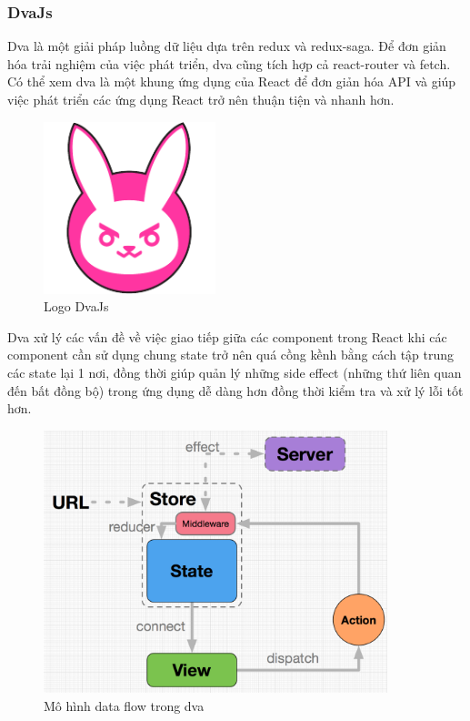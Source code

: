     \subsubsection{DvaJs}
    \hspace*{0.5cm} Dva là một giải pháp luồng dữ liệu dựa trên redux và redux-saga. Để đơn giản hóa trải nghiệm của việc phát triển, dva cũng tích hợp cả react-router và fetch. Có thể xem dva là một khung ứng dụng của React để đơn giản hóa API và giúp việc phát triển các ứng dụng React trở nên thuận tiện và nhanh hơn.\\

    \begin{figure}[!htp]
        \begin{center}
        \includegraphics[width=5cm]{img/Technology/dva.png}
        \end{center}
        \caption{Logo DvaJs \cite{technologyDva}}
    \end{figure}

    Dva xử lý các vấn đề về việc giao tiếp giữa các component trong React khi các component cần sử dụng chung state trở nên quá cồng kềnh bằng cách tập trung các state lại 1 nơi, đồng thời giúp quản lý những side effect (những thứ liên quan đến bất đồng bộ) trong ứng dụng dễ dàng hơn đồng thời kiểm tra và xử lý lỗi tốt hơn.\\

    \begin{figure}[!htp]
        \begin{center}
        \includegraphics[width=10cm]{img/Technology/dva-struct.png}
        \end{center}
        \caption{Mô hình data flow trong dva \cite{technologyDvaAdvance}}
    \end{figure}

